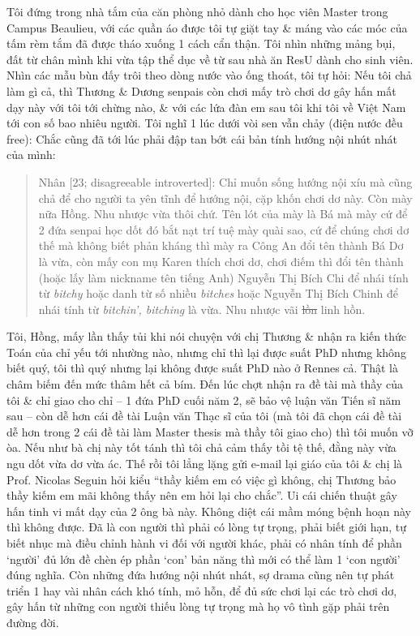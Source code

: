 \documentclass[12pt,twoside]{book}
\begin{document}
Tôi đứng trong nhà tắm của căn phòng nhỏ dành cho học viên Master trong Campus Beaulieu, với các quần áo được tôi tự giặt tay \& máng vào các móc của tấm rèm tắm đã được tháo xuống 1 cách cẩn thận. Tôi nhìn những mảng bụi, đất từ chân mình khi vừa tập thể dục về từ sau nhà ăn ResU dành cho sinh viên. Nhìn các mẫu bùn đấy trôi theo dòng nước vào ống thoát, tôi tự hỏi: Nếu tôi chả làm gì cả, thì {\sf Thương} \& {\sf Dương} senpais còn chơi mấy trò chơi dơ gây hấn mất dạy này với tôi tới chừng nào, \& với các lứa đàn em sau tôi khi tôi về Việt Nam tới con số bao nhiêu người. Tôi nghĩ 1 lúc dưới vòi sen vẫn chảy (điện nước đều free): Chắc cũng đã tới lúc phải đập tan bớt cái bản tính hướng nội nhút nhát của mình: 
\begin{quote}
	{\sf Nhân [23; disagreeable introverted]}: Chỉ muốn sống hướng nội xíu mà cũng chả để cho người ta yên tĩnh để hướng nội, cặp khốn chơi dơ này. Còn mày nữa Hồng. Nhu nhược vừa thôi chứ. Tên lót của mày là Bá mà mày cứ để 2 đứa senpai học dốt đó bắt nạt trí tuệ mày quài sao, cứ để chúng chơi dơ thế mà không biết phản kháng thì mày ra Công An đổi tên thành Bá Dơ là vừa, còn mấy con mụ Karen thích chơi dơ, chơi điếm thì đổi tên thành (hoặc lấy làm nickname tên tiếng Anh) {\sf Nguyễn Thị Bích Chi} để nhái tính từ {\it bitchy} hoặc danh từ số nhiều {\it bitches} hoặc {\sf Nguyễn Thị Bích Chinh} để nhái tính từ {\it bitchin', bitching} là vừa. Nhu nhược vãi \st{lồn} linh hồn.
\end{quote}
Tôi, {\sf Hồng}, mấy lần thấy tủi khi nói chuyện với chị {\sf Thương} \& nhận ra kiến thức Toán của chỉ yếu tới nhường nào, nhưng chỉ thì lại được suất PhD nhưng không biết quý, tôi thì quý nhưng lại không được suất PhD nào ở Rennes cả. Thật là châm biếm đến mức thâm hết cả bím. Đến lúc chợt nhận ra đề tài mà thầy của tôi \& chỉ giao cho chỉ -- 1 đứa PhD cuối năm 2, sẽ bảo vệ luận văn Tiến sĩ năm sau -- còn dễ hơn cái đề tài Luận văn Thạc sĩ của tôi (mà tôi đã chọn cái đề tài dễ hơn trong 2 cái đề tài làm Master thesis mà thầy tôi giao cho) thì tôi muốn vỡ òa. Nếu như bà chị này tốt tánh thì tôi chả cảm thấy tồi tệ thế, đằng này vừa ngu dốt vừa dơ vừa ác. Thế rồi tôi lẳng lặng gửi e-mail lại giáo của tôi \& chị là Prof. {\sc Nicolas Seguin} hỏi kiểu ``thầy kiếm em có việc gì không, chị Thương bảo thầy kiếm em mãi không thấy nên em hỏi lại cho chắc''. Ui cái chiến thuật gây hấn tinh vi mất dạy của 2 ông bà này. Không diệt cái mầm móng bệnh hoạn này thì không được. Đã là con người thì phải có lòng tự trọng, phải biết giới hạn, tự biết nhục mà điều chỉnh hành vi đối với người khác, phải có nhân tính để phần `người' đủ lớn đề chèn ép phần `con' bản năng thì mới có thể làm 1 `con người' đúng nghĩa. Còn những đứa hướng nội nhút nhát, sợ drama cũng nên tự phát triển 1 hay vài nhân cách khó tính, mỏ hỗn, để đủ sức chơi lại các trò chơi dơ, gây hấn từ những con người thiếu lòng tự trọng mà họ vô tình gặp phải trên đường đời.
\end{document}
